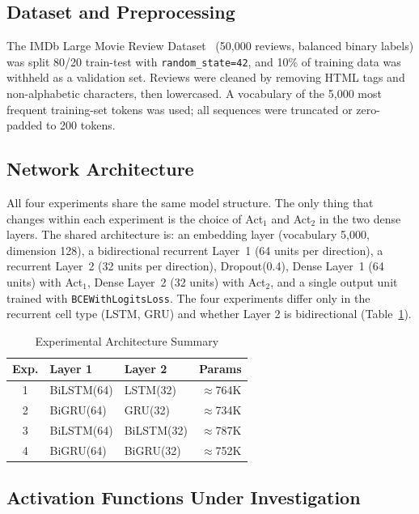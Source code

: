 \documentclass[conference]{IEEEtran}
\begin{document}
\subsection{Dataset and Preprocessing}

The IMDb Large Movie Review Dataset~\cite{maas2011} (50,000
reviews, balanced binary labels) was split 80/20 train-test
with \texttt{random\_state=42}, and 10\% of
training data was withheld as a validation set. Reviews were
cleaned by removing HTML tags and non-alphabetic characters,
then lowercased. A vocabulary of the 5,000 most frequent
training-set tokens was used; all sequences were truncated or
zero-padded to 200 tokens.

\subsection{Network Architecture}

All four experiments share the same model structure. The
only thing that changes within each experiment is the choice of
Act$_1$ and Act$_2$ in the two dense layers. The shared architecture
is: an embedding layer
(vocabulary 5,000, dimension 128), a bidirectional recurrent
Layer~1 (64 units per direction), a recurrent Layer~2 (32
units per direction), Dropout(0.4), Dense Layer~1 (64 units)
with Act$_1$, Dense Layer~2 (32 units) with Act$_2$, and a
single output unit trained with \texttt{BCEWithLogitsLoss}.
The four experiments differ only in the recurrent cell type
(LSTM, GRU) and whether Layer 2
is bidirectional (Table~\ref{tab:architectures}).

\begin{table}[htbp]
  \caption{Experimental Architecture Summary}
  \label{tab:architectures}
  \centering
  \footnotesize
  \setlength{\tabcolsep}{4pt}
  \renewcommand{\arraystretch}{1.08}
  \begin{tabular}{cllr}
    \toprule
    Exp. & Layer 1 & Layer 2 & Params \\
    \midrule
    1 & BiLSTM(64) & LSTM(32)    & ${\approx}$764K \\
    2 & BiGRU(64)  & GRU(32)     & ${\approx}$734K \\
    3 & BiLSTM(64) & BiLSTM(32)  & ${\approx}$787K \\
    4 & BiGRU(64)  & BiGRU(32)   & ${\approx}$752K \\
    \bottomrule
  \end{tabular}
\end{table}

\subsection{Activation Functions Under Investigation}
\end{document}
